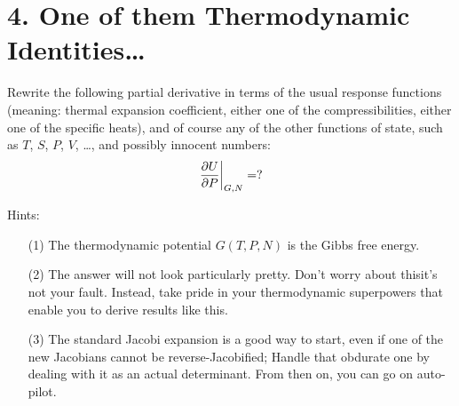 \documentclass[a4paper,twoside]{article}
\begin{document}
\section*{4. One of them Thermodynamic Identities\ldots}
Rewrite the following partial derivative in terms of the usual response functions (meaning: thermal expansion coefficient, either one of the compressibilities, either one of the specific heats), and of course any of the other functions of state, such as $ T $, $ S $, $ P $, $ V $, \ldots, and possibly innocent numbers:
\begin{equation}
    \eval{\pdv{U}{P}}_{G,N} = ?
\end{equation}

Hints:
\begin{itemize}
    \item[(1)] The thermodynamic potential $ G(T, P, N) $ is the Gibbs free energy.
    \item[(2)] The answer will not look particularly pretty. Don't worry about this\textemdash it's not your fault. Instead, take pride in your thermodynamic superpowers that enable you to derive results like this.
    \item[(3)] The standard Jacobi expansion is a good way to start, even if one of the new Jacobians cannot be reverse-Jacobified; Handle that obdurate one by dealing with it as an actual determinant. From then on, you can go on auto-pilot.
\end{itemize}
\end{document}
